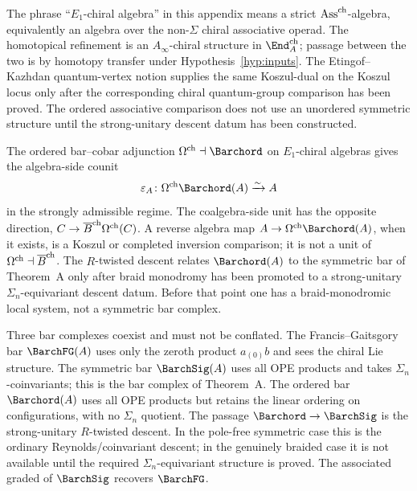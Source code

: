 \begin{remark}
\label{rem:app-ord-assoc-notion-fixed}
The phrase ``$E_1$-chiral algebra'' in this appendix means a strict
$\mathrm{Ass}^{\mathrm{ch}}$-algebra, equivalently an algebra over the non-$\Sigma$
chiral associative operad. The homotopical refinement is an
$A_\infty$-chiral structure in $\End^{\mathrm{ch}}_A$; passage between
the two is by homotopy transfer under Hypothesis~\ref{hyp:inputs}.
The Etingof--Kazhdan quantum-vertex notion supplies the same
Koszul-dual on the Koszul locus only after the corresponding chiral
quantum-group comparison has been proved. The ordered associative
comparison does not use an unordered symmetric structure until
the strong-unitary descent datum has been constructed.
\end{remark}

\begin{remark}
\label{rem:app-ord-assoc-koszul-reflection-bridge}
The ordered bar--cobar adjunction $\Cobar\dashv\Barchord$ on $E_1$-chiral
algebras gives the algebra-side counit
\[
\varepsilon_A\colon \Cobar\Barchord(A)\xrightarrow{\sim} A
\]
in the strongly admissible regime. The coalgebra-side unit has the
opposite direction, $C\to\overline{B}^{\mathrm{ch}}\Omega^{\mathrm{ch}}(C)$. A reverse algebra map
$A\to\Cobar\Barchord(A)$, when it exists, is a Koszul or completed
inversion comparison; it is not a unit of $\Omega^{\mathrm{ch}}\dashv\overline{B}^{\mathrm{ch}}$.
The $R$-twisted descent relates $\Barchord(A)$ to the symmetric bar of
Theorem~A only after braid monodromy has been promoted to a
strong-unitary $\Sigma_n$-equivariant descent datum. Before that point
one has a braid-monodromic local system, not a symmetric bar complex.
\end{remark}

Three bar complexes coexist and must not be conflated.
The Francis--Gaitsgory bar $\BarchFG(A)$ uses only the zeroth
product $a_{(0)}b$ and sees the chiral Lie structure.
The symmetric bar $\BarchSig(A)$ uses all OPE products and takes
$\Sigma_n$-coinvariants; this is the bar complex of Theorem~A.
The ordered bar $\Barchord(A)$ uses all OPE products but retains
the linear ordering on configurations, with no $\Sigma_n$ quotient.
The passage $\Barchord\to \BarchSig$ is the strong-unitary
$R$-twisted descent. In the pole-free symmetric case this is the
ordinary Reynolds/coinvariant descent; in the genuinely braided case it
is not available until the required $\Sigma_n$-equivariant structure is
proved. The associated graded of $\BarchSig$ recovers $\BarchFG$.

